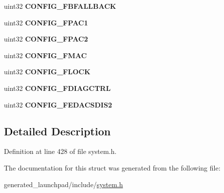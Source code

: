 \begin{DoxyCompactItemize}
uint32 {\bfseries C\+O\+N\+F\+I\+G\+\_\+\+F\+B\+F\+A\+L\+L\+B\+A\+CK}
\item 
\mbox{\label{structtcmflash__config__reg_a0f0b4a36c352f5b895fd9068e4e3cf14}} 
uint32 {\bfseries C\+O\+N\+F\+I\+G\+\_\+\+F\+P\+A\+C1}
\item 
\mbox{\label{structtcmflash__config__reg_a768b583adac08be27f6bbd07e342d6ae}} 
uint32 {\bfseries C\+O\+N\+F\+I\+G\+\_\+\+F\+P\+A\+C2}
\item 
\mbox{\label{structtcmflash__config__reg_aa1d619a6f678bc69eaab88189e7cdf3f}} 
uint32 {\bfseries C\+O\+N\+F\+I\+G\+\_\+\+F\+M\+AC}
\item 
\mbox{\label{structtcmflash__config__reg_a704eb0435ed5bbcd8c8f4f91e8cef006}} 
uint32 {\bfseries C\+O\+N\+F\+I\+G\+\_\+\+F\+L\+O\+CK}
\item 
\mbox{\label{structtcmflash__config__reg_a09c977c66e3ece4381a6f832087fac72}} 
uint32 {\bfseries C\+O\+N\+F\+I\+G\+\_\+\+F\+D\+I\+A\+G\+C\+T\+RL}
\item 
\mbox{\label{structtcmflash__config__reg_a023febbd12e242ada9e91451a359ccaf}} 
uint32 {\bfseries C\+O\+N\+F\+I\+G\+\_\+\+F\+E\+D\+A\+C\+S\+D\+I\+S2}
\end{DoxyCompactItemize}


\subsection{Detailed Description}


Definition at line 428 of file system.\+h.



The documentation for this struct was generated from the following file\+:\begin{DoxyCompactItemize}
\item 
generated\+\_\+launchpad/include/\mbox{\hyperlink{system_8h}{system.\+h}}\end{DoxyCompactItemize}
